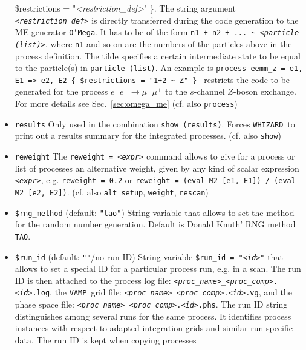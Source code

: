 \documentclass[12pt]{book}
\newcommand{\ttt}[1]{\texttt{#1}}
\newcommand{\whizard}{\texttt{WHIZARD}}
\newcommand{\oMega}{\texttt{O'Mega}}
\newcommand{\vamp}{\texttt{VAMP}}
\begin{document}
\begin{itemize}
{  \$restrictions = "{\em <restriction\_def>}" \}}. The string argument
\ttt{{\em <restriction\_def>}} 
is directly transferred during the code generation to the ME generator
\oMega. It has to be of the form \ttt{n1 + n2 + ... 
\url{~} {\em <particle (list)>}}, where \ttt{n1} and so on are the numbers of the
particles above in the process definition. The tilde specifies a
certain intermediate state to be equal to the particle(s) in
\ttt{particle (list)}. An example is \ttt{process eemm\_z =     e1,
  E1  =>  e2, E2 \{ \$restrictions = "1+2 \url{~} Z" \} } restricts the code
to be generated for the process $e^- e^+ \to \mu^- \mu^+$ to the
$s$-channel $Z$-boson exchange. For more details see
Sec.~\ref{sec:omega_me} (cf. also \ttt{process})
\item
\ttt{results} \newline
Only used in the combination \ttt{show (results)}. Forces \whizard\ to
print out a results summary for the integrated processes. 
(cf. also \ttt{show})
\item
\ttt{reweight} \newline
The \ttt{reweight = {\em <expr>}} command allows to give for a process or
list of processes an alternative weight, given by any kind of scalar
expression \ttt{{\em <expr>}}, e.g. \ttt{reweight = 0.2} or \ttt{reweight =
(eval M2 [e1, E1]) / (eval M2 [e2, E2])}. (cf. also \ttt{alt\_setup},
\ttt{weight}, \ttt{rescan})
\item
\ttt{\$rng\_method} \qquad (default: \ttt{"tao"}) \newline
String variable that allows to set the method for the random number
generation. Default is Donald Knuth' RNG method \ttt{TAO}. 
\item
\ttt{\$run\_id} \qquad (default: \ttt{""}/no run ID) \newline
String variable \ttt{\$run\_id = "{\em <id>}"} that allows to set a special
ID for a particular process run, e.g. in a scan. The run ID is then
attached to the process log file: \newline
\ttt{{\em <proc\_name>}\_{\em <proc\_comp>}.{\em <id>}.log}, the \vamp\ grid file:
\newline 
\ttt{{\em <proc\_name>}\_{\em <proc\_comp>}.{\em <id>}.vg}, and the phase space file:
\newline 
\ttt{{\em <proc\_name>}\_{\em <proc\_comp>}.{\em <id>}.phs}. The run ID string
distinguishes among several runs for the same process.  It identifies
process instances with respect to adapted integration grids and
similar run-specific data.  The run ID is kept when copying processes

\end{itemize}
\end{document}
